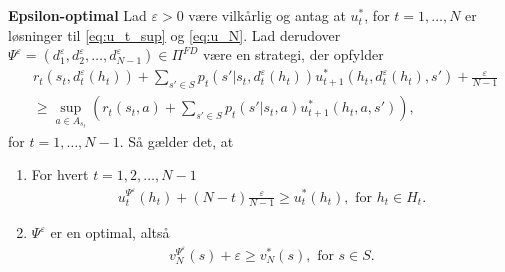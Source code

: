 \section{}\label{Snyd}
\begin{minipage}\textwidth
\begin{thmx} \textbf{Epsilon-optimal} \label{sæt:epsopt}%
\newline
Lad $\varepsilon>0$ være vilkårlig og antag at $u^*_t$, for $t=1,\ldots, N$ er løsninger til \eqref{eq:u_t_sup} og \eqref{eq:u_N}. Lad derudover $\Psi^\varepsilon = (d_1^\varepsilon, d_2^\varepsilon, \ldots, d_{N-1}^\varepsilon) \in \Pi^{FD}$ være en strategi, der opfylder
\begin{align}
    &r_t\left(s_t, d_t^\varepsilon(h_t)\right)+\sum_{s'\in S}p_t\left(s'|s_t, d_t^\varepsilon(h_t)\right)u_{t+1}^*\left(h_t, d_t^\varepsilon(h_t), s'\right) + \frac{\varepsilon}{N-1}\nonumber\\
    &\geq \sup_{a\in A_{s_t}}\left(r_t(s_t,a)+\sum_{s'\in S}p_t(s'|s_t, a)u_{t+1}^*(h_t, a, s')\right),\label{eq:bilag_epsilon_optimal} 
\end{align}
for $t=1, \ldots, N-1$.
Så gælder det, at
\begin{enumerate}
    \item For hvert $t = 1, 2, \ldots, N-1$
    \begin{align*}
        u_t^{\Psi^\varepsilon}(h_t) +(N-t)\frac{\varepsilon}{N-1}\geq  u_t^*(h_t), \text{ for } h_t \in H_t.
    \end{align*}
    \item $\Psi^\varepsilon$ er en optimal, altså
    \begin{align*}
      v_N^{\Psi^\varepsilon}(s) + \varepsilon \geq v_N^*(s), \text{ for } s \in S.
    \end{align*}
\end{enumerate}
\end{thmx}
\end{minipage}